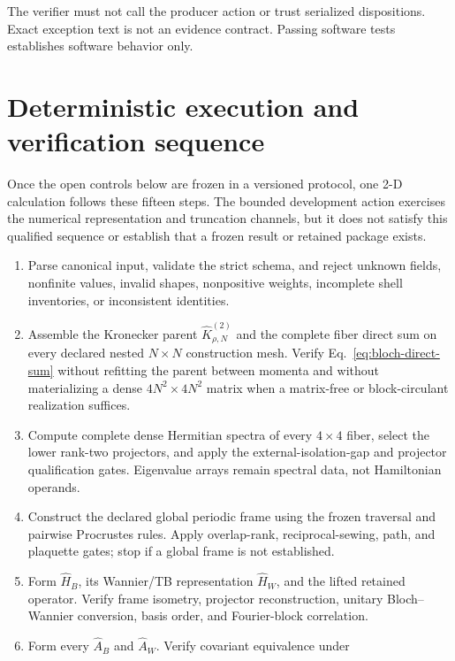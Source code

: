 \documentclass[11pt]{article}
\begin{document}
The verifier must not call the producer action or trust serialized dispositions. Exact
exception text is not an evidence contract. Passing software tests establishes software
behavior only.

\section{Deterministic execution and verification sequence}

Once the open controls below are frozen in a versioned protocol, one 2-D calculation
follows these fifteen steps. The bounded development action exercises the numerical
representation and truncation channels, but it does not satisfy this qualified sequence
or establish that a frozen result or retained package exists.

\begin{enumerate}[label=\arabic*.]
 \item Parse canonical input, validate the strict schema, and reject unknown fields,
       nonfinite values, invalid shapes, nonpositive weights, incomplete shell
       inventories, or inconsistent identities.
 \item Assemble the Kronecker parent $\widehat K_{\rho,N}^{(2)}$ and the complete
       fiber direct sum on every declared nested $N\times N$ construction mesh. Verify
       Eq.~\eqref{eq:bloch-direct-sum} without refitting the parent between momenta and
       without materializing a dense $4N^2\times4N^2$ matrix when a matrix-free or
       block-circulant realization suffices.
 \item Compute complete dense Hermitian spectra of every $4\times4$ fiber, select the
       lower rank-two projectors, and apply the external-isolation-gap and projector qualification
       gates. Eigenvalue arrays remain spectral data, not Hamiltonian operands.
 \item Construct the declared global periodic frame using the frozen traversal and
       pairwise Procrustes rules. Apply overlap-rank, reciprocal-sewing, path, and
       plaquette gates; stop if a global frame is not established.
 \item Form $\widehat H_B$, its Wannier/TB representation $\widehat H_W$, and the lifted
       retained operator. Verify frame isometry, projector reconstruction, unitary
       Bloch--Wannier conversion, basis order, and Fourier-block correlation.
 \item Form every $\widehat A_B$ and $\widehat A_W$. Verify covariant equivalence under

\end{enumerate}
\end{document}
